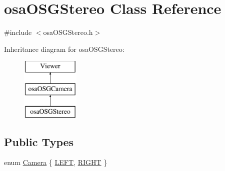 \hypertarget{classosa_o_s_g_stereo}{\section{osa\-O\-S\-G\-Stereo Class Reference}
\label{classosa_o_s_g_stereo}
}


{\ttfamily \#include $<$osa\-O\-S\-G\-Stereo.\-h$>$}

Inheritance diagram for osa\-O\-S\-G\-Stereo\-:\begin{figure}[H]
\begin{center}
\leavevmode
\includegraphics[height=3.000000cm]{da/d8d/classosa_o_s_g_stereo}
\end{center}
\end{figure}
\subsection*{Public Types}
\begin{DoxyCompactItemize}
\item 
enum \hyperlink{classosa_o_s_g_stereo_a6f3072fa8cc1d46fcedff6b2d497f396}{Camera} \{ \hyperlink{classosa_o_s_g_stereo_a6f3072fa8cc1d46fcedff6b2d497f396a7d425a8f4711074d0aada8186a7fabc4}{L\-E\-F\-T}, 
\hyperlink{classosa_o_s_g_stereo_a6f3072fa8cc1d46fcedff6b2d497f396a26b5df6fc40a2f0e4976129b85e091d1}{R\-I\-G\-H\-T}
 \}
\end{DoxyCompactItemize}
